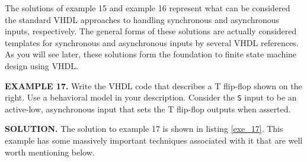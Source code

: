 The solutions of example 15 and example 16 represent what can be considered the standard VHDL approaches to handling synchronous and asynchronous inputs, respectively. The general forms of these solutions are actually considered templates for synchronous and asynchronous inputs by several VHDL references. As you will see later, these solutions form the foundation to finite state machine design using VHDL.

\begin{leftbar}
\begin{minipage}{0.5\linewidth}
\noindent
\textbf{EXAMPLE 17.}
Write the VHDL code that describes a T flip-flop shown on the right. Use a behavioral model in your description. Consider the \texttt{S} input to be an active-low, asynchronous input that sets the T flip-flop outputs when asserted.
\end{minipage}
\begin{minipage}{0.47\linewidth}
\begin{flushright}
\end{flushright}
\end{minipage}
\end{leftbar}
\noindent
\textbf{SOLUTION.} The solution to example 17 is shown in listing \ref{exe_17}. This example has some massively important techniques associated with it that are well worth mentioning below.
